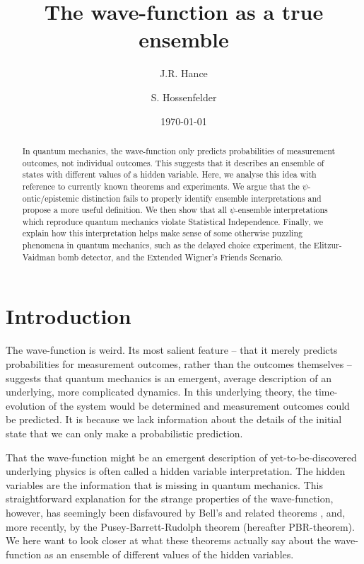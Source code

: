 \documentclass[superscriptaddress,floatfix,nofootinbib,12pt]{revtex4-2}
\begin{document}
\title{The wave-function as a true ensemble}
\author{J.R. Hance}
\author{S. Hossenfelder}
\date{\today}

\begin{abstract}
In quantum mechanics, the wave-function only predicts probabilities of measurement outcomes, not individual outcomes. This suggests that it describes an ensemble of states with different values of a hidden variable. Here, we analyse this idea with reference to currently known theorems and experiments. We argue that the $\psi$-ontic/epistemic distinction fails to properly identify ensemble interpretations and propose a more useful definition. We then show that all $\psi$-ensemble interpretations which reproduce quantum mechanics violate Statistical Independence. Finally, we explain how this interpretation helps make sense of some otherwise puzzling phenomena in quantum mechanics, such as the delayed choice experiment, the Elitzur-Vaidman bomb detector, and the Extended Wigner's Friends Scenario.
\end{abstract}

\maketitle

\section{Introduction}

The wave-function is weird. Its most salient feature -- that it merely predicts probabilities for measurement outcomes, rather than the outcomes themselves -- suggests that quantum mechanics is an emergent, average description of an underlying, more complicated dynamics. In this underlying theory, the time-evolution of the system would be determined and measurement outcomes could be predicted. It is because we lack information about the details of the initial state that we can only make a probabilistic prediction.  

That the wave-function might be an emergent description of yet-to-be-discovered underlying physics is often called a hidden variable interpretation. The hidden variables are the information that is missing in quantum mechanics. This straightforward explanation for the strange properties of the wave-function, however, has seemingly been disfavoured by Bell's and related theorems \cite{Bell1964OnEPR,Clauser1969CHSH}, and, more recently, by the Pusey-Barrett-Rudolph theorem \cite{Pusey2012Reality,Leifer_2014} (hereafter {\sc PBR}-theorem). We here want to look closer at what these theorems actually say about the wave-function as an ensemble of different values of the hidden variables. 
\end{document}
